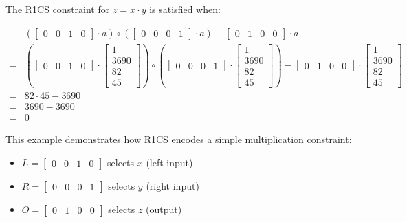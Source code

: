 \documentclass{article}
\begin{document}
The R1CS constraint for $z = x \cdot y$ is satisfied when:

\begin{align*}
&(\begin{bmatrix} 0 & 0 & 1 & 0 \end{bmatrix} \cdot a) \circ (\begin{bmatrix} 0 & 0 & 0 & 1 \end{bmatrix} \cdot a) - \begin{bmatrix} 0 & 1 & 0 & 0 \end{bmatrix} \cdot a \\
=&(\begin{bmatrix} 0 & 0 & 1 & 0 \end{bmatrix} \cdot \begin{bmatrix}
1 \\ 3690 \\ 82 \\ 45
\end{bmatrix}) \circ (\begin{bmatrix} 0 & 0 & 0 & 1 \end{bmatrix} \cdot \begin{bmatrix}
1 \\ 3690 \\ 82 \\ 45
\end{bmatrix}) - \begin{bmatrix} 0 & 1 & 0 & 0 \end{bmatrix} \cdot \begin{bmatrix}
1 \\ 3690 \\ 82 \\ 45
\end{bmatrix} \\
=& 82 \cdot 45 - 3690 \\
=& 3690 - 3690 \\
=& 0
\end{align*}

This example demonstrates how R1CS encodes a simple multiplication constraint:
\begin{itemize}
\item $L = \begin{bmatrix} 0 & 0 & 1 & 0 \end{bmatrix}$ selects $x$ (left input)
\item $R = \begin{bmatrix} 0 & 0 & 0 & 1 \end{bmatrix}$ selects $y$ (right input)
\item $O = \begin{bmatrix} 0 & 1 & 0 & 0 \end{bmatrix}$ selects $z$ (output)
\end{itemize}
\end{document}
